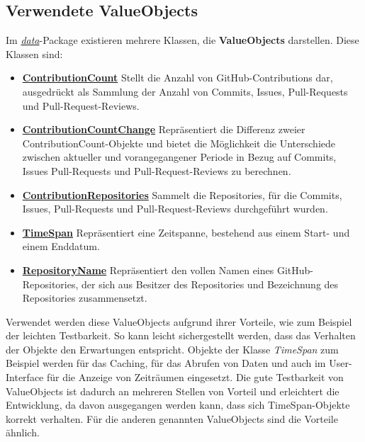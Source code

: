 \subsection{Verwendete ValueObjects}
Im \textit{\href{https://github.com/lukaspanni/OpenSourceStats/tree/main/app/src/main/java/de/lukaspanni/opensourcestats/data}{data}}-Package existieren mehrere Klassen, die \textbf{ValueObjects} darstellen.
\newline
Diese Klassen sind:
\begin{itemize}
\item{\textbf{\href{https://github.com/lukaspanni/OpenSourceStats/blob/main/app/src/main/java/de/lukaspanni/opensourcestats/data/ContributionCount.java}{ContributionCount}}}
\newline
Stellt die Anzahl von GitHub-Contributions dar, ausgedrückt als Sammlung der Anzahl von Commits, Issues, Pull-Requests und Pull-Request-Reviews.
\item{\textbf{\href{https://github.com/lukaspanni/OpenSourceStats/blob/main/app/src/main/java/de/lukaspanni/opensourcestats/data/ContributionCountChange.java}{ContributionCountChange}}}
\newline
Repräsentiert die Differenz zweier ContributionCount-Objekte und bietet die Möglichkeit die Unterschiede zwischen aktueller und vorangegangener Periode in Bezug auf Commits, Issues Pull-Requests und Pull-Request-Reviews zu berechnen. 
\item{\textbf{\href{https://github.com/lukaspanni/OpenSourceStats/blob/main/app/src/main/java/de/lukaspanni/opensourcestats/data/ContributionRepositories.java}{ContributionRepositories}}}
\newline
Sammelt die Repositories, für die Commits, Issues, Pull-Requests und Pull-Request-Reviews durchgeführt wurden.
\item{\textbf{\href{https://github.com/lukaspanni/OpenSourceStats/blob/main/app/src/main/java/de/lukaspanni/opensourcestats/data/TimeSpan.java}{TimeSpan}}}
\newline
Repräsentiert eine Zeitspanne, bestehend aus einem Start- und einem Enddatum.
\item{\textbf{\href{https://github.com/lukaspanni/OpenSourceStats/blob/main/app/src/main/java/de/lukaspanni/opensourcestats/data/RepositoryName.java}{RepositoryName}}}
\newline
Repräsentiert den vollen Namen eines GitHub-Repositories, der sich aus Besitzer des Repositories und Bezeichnung des Repositories zusammensetzt.
\end{itemize}
Verwendet werden diese ValueObjects aufgrund ihrer Vorteile, wie zum Beispiel der leichten Testbarkeit.
So kann leicht sichergestellt werden, dass das Verhalten der Objekte den Erwartungen entspricht.
\newline
Objekte der Klasse \textit{TimeSpan} zum Beispiel werden für das Caching, für das Abrufen von Daten und auch im User-Interface für die Anzeige von Zeiträumen eingesetzt.
Die gute Testbarkeit von ValueObjects ist dadurch an mehreren Stellen von Vorteil und erleichtert die Entwicklung, da davon ausgegangen werden kann, dass sich TimeSpan-Objekte korrekt verhalten.
Für die anderen genannten ValueObjects sind die Vorteile ähnlich.


